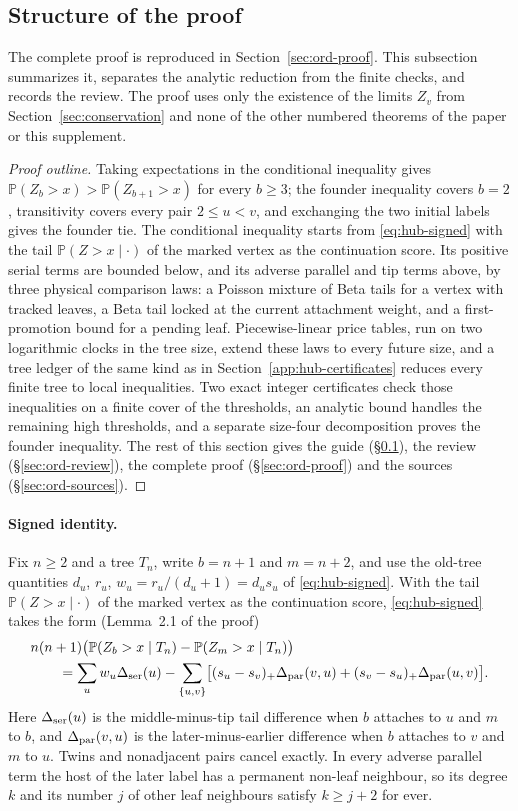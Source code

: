\documentclass[11pt]{article}
\theoremstyle{remark}
\numberwithin{equation}{section}
\newcommand{\Prob}{\mathbb P}
\begin{document}
\subsection{Structure of the proof}\label{sec:ord-guide}
The complete proof is reproduced in Section~\ref{sec:ord-proof}. This subsection summarizes it, separates the analytic reduction from the finite checks, and records the review. The proof uses only the existence of the limits $Z_v$ from Section~\ref{sec:conservation} and none of the other numbered theorems of the paper or this supplement.
\begin{proof}[Proof outline]
Taking expectations in the conditional inequality gives $\Prob(Z_b>x)>\Prob(Z_{b+1}>x)$ for every $b\ge3$; the founder inequality covers $b=2$, transitivity covers every pair $2\le u<v$, and exchanging the two initial labels gives the founder tie. The conditional inequality starts from \eqref{eq:hub-signed} with the tail $\Prob(Z>x\mid\cdot)$ of the marked vertex as the continuation score. Its positive serial terms are bounded below, and its adverse parallel and tip terms above, by three physical comparison laws: a Poisson mixture of Beta tails for a vertex with tracked leaves, a Beta tail locked at the current attachment weight, and a first-promotion bound for a pending leaf. Piecewise-linear price tables, run on two logarithmic clocks in the tree size, extend these laws to every future size, and a tree ledger of the same kind as in Section~\ref{app:hub-certificates} reduces every finite tree to local inequalities. Two exact integer certificates check those inequalities on a finite cover of the thresholds, an analytic bound handles the remaining high thresholds, and a separate size-four decomposition proves the founder inequality. The rest of this section gives the guide (\S\ref{sec:ord-guide}), the review (\S\ref{sec:ord-review}), the complete proof (\S\ref{sec:ord-proof}) and the sources (\S\ref{sec:ord-sources}).
\end{proof}
\paragraph{Signed identity.}
Fix $n\ge2$ and a tree $T_n$, write $b=n+1$ and $m=n+2$, and use the old-tree quantities $d_u$, $r_u$, $w_u=r_u/(d_u+1)=d_us_u$ of \eqref{eq:hub-signed}. With the tail $\Prob(Z>x\mid\cdot)$ of the marked vertex as the continuation score, \eqref{eq:hub-signed} takes the form (Lemma~2.1 of the proof)
\begin{align*}
 &n(n+1)\bigl(\Prob(Z_b>x\mid T_n)-\Prob(Z_m>x\mid T_n)\bigr)\\
 &\qquad=\sum_u w_u\Delta_{\rm ser}(u)-\sum_{\{u,v\}}\bigl[(s_u-s_v)_+\Delta_{\rm par}(v,u)+(s_v-s_u)_+\Delta_{\rm par}(u,v)\bigr].
\end{align*}
Here $\Delta_{\rm ser}(u)$ is the middle-minus-tip tail difference when $b$ attaches to $u$ and $m$ to $b$, and $\Delta_{\rm par}(v,u)$ is the later-minus-earlier difference when $b$ attaches to $v$ and $m$ to $u$. Twins and nonadjacent pairs cancel exactly. In every adverse parallel term the host of the later label has a permanent non-leaf neighbour, so its degree $k$ and its number $j$ of other leaf neighbours satisfy $k\ge j+2$ for ever.
\end{document}
